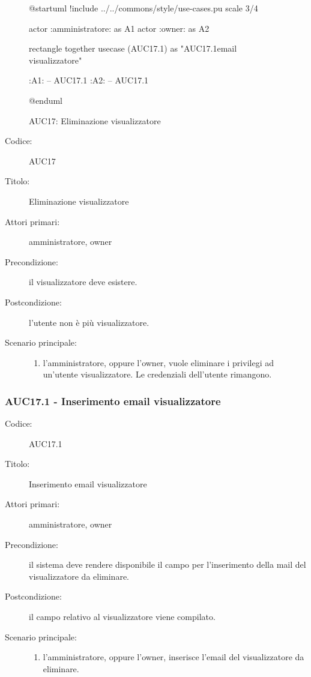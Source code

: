\documentclass[../../../analisi-dei-requisiti.tex]{subfiles}
\begin{document}
\begin{figure}[h!]
  \centering
  \begin{plantuml}
  @startuml
  !include ../../commons/style/use-cases.pu
  scale 3/4

  actor :amministratore: as A1
  actor :owner: as A2

  rectangle {
    together {
      usecase (AUC17.1) as "AUC17.1\nInserimento email visualizzatore"
    }
  }

  :A1: -- AUC17.1
  :A2: -- AUC17.1

  @enduml
  \end{plantuml}
  \caption{AUC17: Eliminazione visualizzatore}
  \label{fig:auc17}
\end{figure}

\begin{description}
  \item[Codice:] AUC17
  \item[Titolo:] Eliminazione visualizzatore
  \item[Attori primari:] amministratore, owner
  \item[Precondizione:] il visualizzatore deve esistere.
  \item[Postcondizione:] l'utente non è più visualizzatore.
  \item[Scenario principale:]
  \begin{enumerate}
    \item l'amministratore, oppure l'owner, vuole eliminare i privilegi ad un'utente visualizzatore. Le credenziali dell'utente rimangono.
  \end{enumerate}
\end{description}

\subsubsection{AUC17.1 - Inserimento email visualizzatore}%
\label{subs:AUC17.1}
\begin{description}
  \item[Codice:] AUC17.1
  \item[Titolo:] Inserimento email visualizzatore
  \item[Attori primari:] amministratore, owner
  \item[Precondizione:] il sistema deve rendere disponibile il campo per l'inserimento della mail del visualizzatore da eliminare.
  \item[Postcondizione:] il campo relativo al visualizzatore viene compilato.
  \item[Scenario principale:]
  \begin{enumerate}
    \item l'amministratore, oppure l'owner, inserisce l'email del visualizzatore da eliminare.
  \end{enumerate}
\end{description}
\end{document}
